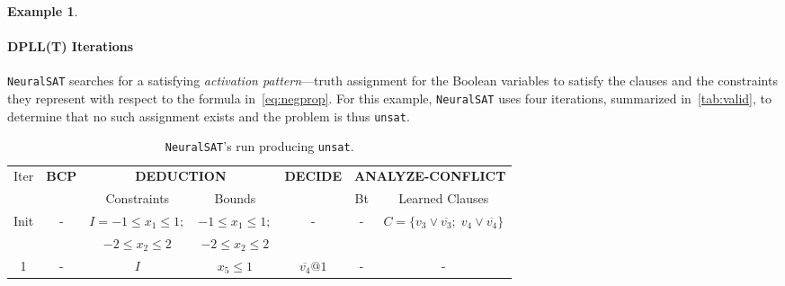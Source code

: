 \documentclass[oneside,11pt,dvipsnames]{book}
\numberwithin{equation}{section}
\theoremstyle{definition}
\newtheorem{example}{Example}[section]
\theoremstyle{remark}
\newcommand{\neuralsat}{\texttt{NeuralSAT}}
\newcommand{\unsat}{\texttt{unsat}}
\begin{document}
\begin{example}
      
      
      
      
      


\paragraph{DPLL(T) Iterations} \neuralsat{} searches for a satisfying \emph{activation pattern}---truth assignment for the Boolean variables to satisfy the clauses and the constraints they represent with respect to the formula in~\autoref{eq:negprop}.
For this example, \neuralsat{} uses four iterations, summarized in~\autoref{tab:valid}, to determine that no such assignment exists and the problem is thus \unsat{}.


\begin{table}
    \centering
    \caption{\neuralsat{}'s run producing \unsat{}.}\label{tab:valid}
    \footnotesize
      \begin{tabular}{ccccccc}
      \toprule
      Iter & \textbf{BCP} & \multicolumn{2}{c}{\textbf{DEDUCTION}}& \textbf{DECIDE} & \multicolumn{2}{c}{\textbf{ANALYZE-CONFLICT}} \\
        &&Constraints&Bounds&&Bt&Learned Clauses\\
        \midrule
        Init &-& $I = -1 \le x_1 \le 1; $& $-1 \le x_1 \le 1;$  & - &-&$C = \{v_3 \lor \overline{v_3};\; v_4 \lor \overline{v_4}\}$\\
        && $-2 \le x_2 \le 2$ & $-2 \le x_2\le 2$& & & \\
        1 &-&$I$ & $ x_5 \le 1 $& $\overline{v_4}@1$&-&-\\
        

\end{tabular}
\end{table}
\end{example}
\end{document}
